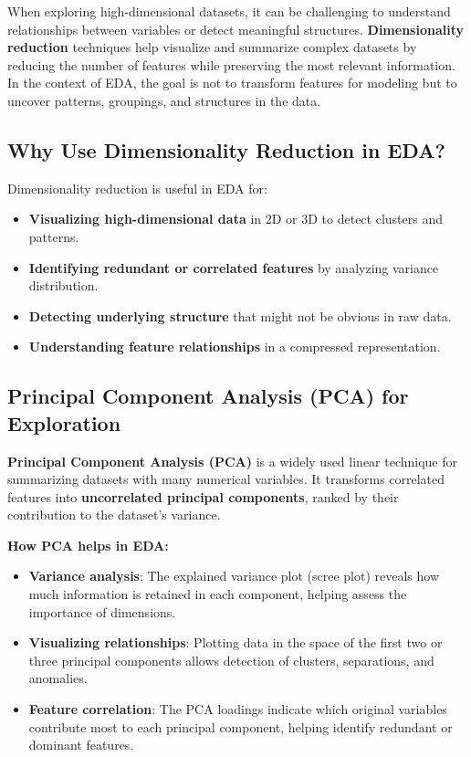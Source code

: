 \documentclass[12pt,openany, draft]{book}
\begin{document}
When exploring high-dimensional datasets, it can be challenging to understand relationships between variables or detect meaningful structures. \textbf{Dimensionality reduction} techniques help visualize and summarize complex datasets by reducing the number of features while preserving the most relevant information. In the context of EDA, the goal is not to transform features for modeling but to uncover patterns, groupings, and structures in the data.

\subsection{Why Use Dimensionality Reduction in EDA?}

Dimensionality reduction is useful in EDA for:
\begin{itemize}
    \item \textbf{Visualizing high-dimensional data} in 2D or 3D to detect clusters and patterns.
    \item \textbf{Identifying redundant or correlated features} by analyzing variance distribution.
    \item \textbf{Detecting underlying structure} that might not be obvious in raw data.
    \item \textbf{Understanding feature relationships} in a compressed representation.
\end{itemize}

\subsection{Principal Component Analysis (PCA) for Exploration}

\textbf{Principal Component Analysis (PCA)} is a widely used linear technique for summarizing datasets with many numerical variables. It transforms correlated features into \textbf{uncorrelated principal components}, ranked by their contribution to the dataset’s variance.

\textbf{How PCA helps in EDA:}
\begin{itemize}
    \item \textbf{Variance analysis}: The explained variance plot (scree plot) reveals how much information is retained in each component, helping assess the importance of dimensions.
    \item \textbf{Visualizing relationships}: Plotting data in the space of the first two or three principal components allows detection of clusters, separations, and anomalies.
    \item \textbf{Feature correlation}: The PCA loadings indicate which original variables contribute most to each principal component, helping identify redundant or dominant features.
\end{itemize}
\end{document}

